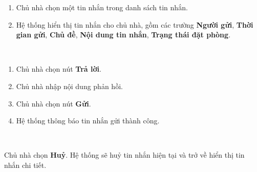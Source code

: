 \begin{usecase}
    
    \normalflow
	\begin{enumerate}
        \item Chủ nhà chọn một tin nhắn trong danh sách tin nhắn.
        \item Hệ thống hiển thị tin nhắn cho chủ nhà, gồm các trường \textbf{Người gửi}, \textbf{Thời gian gửi}, \textbf{Chủ đề}, \textbf{Nội dung tin nhắn}, \textbf{Trạng thái đặt phòng}.
    \end{enumerate} \\ \hline
        
    \noalternative
    \noexception
\end{usecase}

\begin{usecase}

    \normalflow
	\begin{enumerate}
        \item Chủ nhà chọn nút \textbf{Trả lời}.
        \item Chủ nhà nhập nội dung phản hồi.
        \item Chủ nhà chọn nút \textbf{Gửi}.
        \item Hệ thống thông báo tin nhắn gửi thành công.
    \end{enumerate} \\ \hline
        
    \noalternative
    
    \exception
    \begin{enumerate}
         Chủ nhà chọn \textbf{Huỷ}. Hệ thống sẽ huỷ tin nhắn hiện tại và trở về hiển thị tin nhắn chi tiết.
    \end{enumerate} \\ \hline
\end{usecase}


